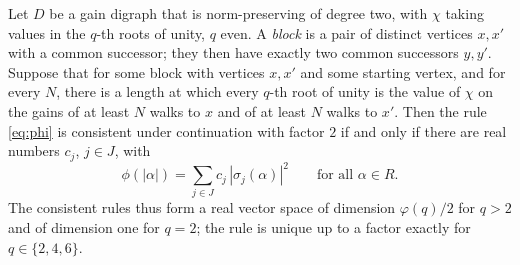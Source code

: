 \begin{theorem}\label{thm:conj}
Let $D$ be a gain digraph that is norm-preserving of degree two, with $\chi$ taking values in the $q$-th roots of unity, $q$ even. A \emph{block} is a pair of distinct vertices $x,x'$ with a common successor; they then have exactly two common successors $y,y'$. Suppose that for some block with vertices $x,x'$ and some starting vertex, and for every $N$, there is a length at which every $q$-th root of unity is the value of $\chi$ on the gains of at least $N$ walks to $x$ and of at least $N$ walks to $x'$. Then the rule \eqref{eq:phi} is consistent under continuation with factor $2$ if and only if there are real numbers $c_j$, $j\in J$, with
\begin{equation}\label{eq:conj}
\phi(|\alpha|)=\sum_{j\in J}c_j\,|\sigma_j(\alpha)|^2\qquad\text{for all }\alpha\in R .
\end{equation}
The consistent rules thus form a real vector space of dimension $\varphi(q)/2$ for $q>2$ and of dimension one for $q=2$; the rule is unique up to a factor exactly for $q\in\{2,4,6\}$.
\end{theorem}
